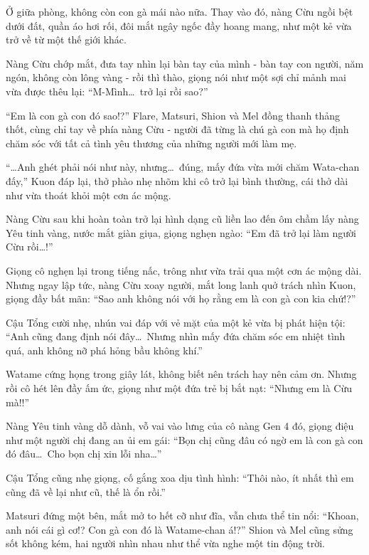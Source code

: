 \documentclass[../main.tex]{subfiles}
\begin{document}
Ở giữa phòng, không còn con gà mái nào nữa. Thay vào đó, nàng Cừu ngồi bệt dưới đất, quần áo hơi rối, đôi mắt ngây ngốc đầy hoang mang, như một kẻ vừa trở về từ một thế giới khác.

Nàng Cừu chớp mắt, đưa tay nhìn lại bàn tay của mình - bàn tay con người, năm ngón, không còn lông vàng - rồi thì thào, giọng nói như một sợi chỉ mảnh mai vừa được thêu lại: ``M-Mình\dots\ trở lại rồi sao?''

\omk

``Em là con gà con đó sao!?'' Flare, Matsuri, Shion và Mel đồng thanh thảng thốt, cùng chỉ tay về phía nàng Cừu - người đã từng là chú gà con mà họ định chăm sóc với tất cả tình yêu thương của những người mới làm mẹ.

``\dots Anh ghét phải nói như này, nhưng\dots\ đúng, mấy đứa vừa mới chăm Wata-chan đấy,'' Kuon đáp lại, thở phào nhẹ nhõm khi cô trở lại bình thường, cái thở dài như vừa thoát khỏi một cơn ác mộng.

Nàng Cừu sau khi hoàn toàn trở lại hình dạng cũ liền lao đến ôm chầm lấy nàng Yêu tinh vàng, nước mắt giàn giụa, giọng nghẹn ngào: ``Em đã trở lại làm người Cừu rồi\dots!''


Giọng cô nghẹn lại trong tiếng nấc, trông như vừa trải qua một cơn ác mộng dài. Nhưng ngay lập tức, nàng Cừu xoay người, mắt long lanh quở trách nhìn Kuon, giọng đầy bất mãn: ``Sao anh không nói với họ rằng em là con gà con kia chứ!?''

Cậu Tổng cười nhẹ, nhún vai đáp với vẻ mặt của một kẻ vừa bị phát hiện tội: ``Anh cũng đang định nói đây\dots\ Nhưng nhìn mấy đứa chăm sóc em nhiệt tình quá, anh không nỡ phá hỏng bầu không khí.''

Watame cứng họng trong giây lát, không biết nên trách hay nên cảm ơn. Nhưng rồi cô hét lên đầy ấm ức, giọng như một đứa trẻ bị bắt nạt: ``Nhưng em là Cừu mà!!''

Nàng Yêu tinh vàng dỗ dành, vỗ vai vào lưng của cô nàng Gen 4 đó, giọng điệu như một người chị đang an ủi em gái: ``Bọn chị cũng đâu có ngờ em là con gà con đó đâu\dots\ Cho bọn chị xin lỗi nha\dots''

Cậu Tổng cũng nhẹ giọng, cố gắng xoa dịu tình hình: ``Thôi nào, ít nhất thì em cũng đã về lại như cũ, thế là ổn rồi.''

Matsuri đứng một bên, mắt mở to hết cỡ như đĩa, vẫn chưa thể tin nổi: ``Khoan, anh nói cái gì cơ!? Con gà con đó là Watame-chan á!?''  Shion và Mel cũng sửng sốt không kém, hai người nhìn nhau như thể vừa nghe một tin động trời.
\end{document}
